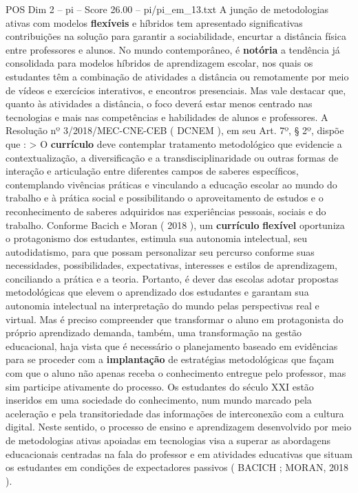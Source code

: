 \begin{textsample}{POS Dim 2 – pi – Score 26.00 – pi/pi\_em\_13.txt}
A junção de metodologias ativas com modelos \textbf{flexíveis} e híbridos tem apresentado significativas contribuições na solução para garantir a sociabilidade, encurtar a distância física entre professores e alunos.
No mundo contemporâneo, é \textbf{notória} a tendência já consolidada para modelos híbridos de aprendizagem escolar, nos quais os estudantes têm a combinação de atividades a distância ou remotamente por meio de vídeos e exercícios interativos, e encontros presenciais.
Mas vale destacar que, quanto às atividades a distância, o foco deverá estar menos centrado nas tecnologias e mais nas competências e habilidades de alunos e professores.
A Resolução nº 3/2018/MEC-CNE-CEB ( DCNEM ), em seu Art. 7º, § 2º, dispõe que : > O \textbf{currículo} deve contemplar tratamento metodológico que evidencie a contextualização, a diversificação e a transdisciplinaridade ou outras formas de interação e articulação entre diferentes campos de saberes específicos, contemplando vivências práticas e vinculando a educação escolar ao mundo do trabalho e à prática social e possibilitando o aproveitamento de estudos e o reconhecimento de saberes adquiridos nas experiências pessoais, sociais e do trabalho.
Conforme Bacich e Moran ( 2018 ), um \textbf{currículo} \textbf{flexível} oportuniza o protagonismo dos estudantes, estimula sua autonomia intelectual, seu autodidatismo, para que possam personalizar seu percurso conforme suas necessidades, possibilidades, expectativas, interesses e estilos de aprendizagem, conciliando a prática e a teoria.
Portanto, é dever das escolas adotar propostas metodológicas que elevem o aprendizado dos estudantes e garantam sua autonomia intelectual na interpretação do mundo pelas perspectivas real e virtual.
Mas é preciso compreender que transformar o aluno em protagonista do próprio aprendizado demanda, também, uma transformação na gestão educacional, haja vista que é necessário o planejamento baseado em evidências para se proceder com a \textbf{implantação} de estratégias metodológicas que façam com que o aluno não apenas receba o conhecimento entregue pelo professor, mas sim participe ativamente do processo.
Os estudantes do século XXI estão inseridos em uma sociedade do conhecimento, num mundo marcado pela aceleração e pela transitoriedade das informações de interconexão com a cultura digital.
Neste sentido, o processo de ensino e aprendizagem desenvolvido por meio de metodologias ativas apoiadas em tecnologias visa a superar as abordagens educacionais centradas na fala do professor e em atividades educativas que situam os estudantes em condições de expectadores passivos ( BACICH ; MORAN, 2018 ).

\end{textsample}
